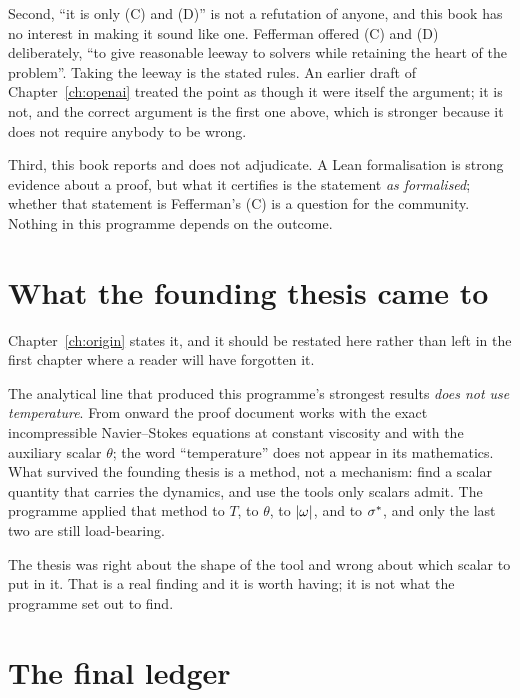 Second, ``it is only (C) and (D)'' is not a refutation of anyone, and this
book has no interest in making it sound like one. Fefferman offered (C) and
(D) deliberately, ``to give reasonable leeway to solvers while retaining the
heart of the problem''. Taking the leeway is the stated rules. An earlier
draft of Chapter~\ref{ch:openai} treated the point as though it were itself
the argument; it is not, and the correct argument is the first one above,
which is stronger because it does not require anybody to be wrong.

Third, this book reports and does not adjudicate. A Lean formalisation is
strong evidence about a proof, but what it certifies is the statement
\emph{as formalised}; whether that statement is Fefferman's (C) is a question
for the community. Nothing in this programme depends on the outcome.

\section{What the founding thesis came to}
\label{sec:thesis-verdict}

Chapter~\ref{ch:origin} states it, and it should be restated here rather than
left in the first chapter where a reader will have forgotten it.

The analytical line that produced this programme's strongest results
\emph{does not use temperature}. From  onward the proof document works
with the exact incompressible Navier--Stokes equations at constant viscosity
and with the auxiliary scalar \(\theta\); the word ``temperature'' does not
appear in its mathematics. What survived the founding thesis is a method, not
a mechanism: find a scalar quantity that carries the dynamics, and use the
tools only scalars admit. The programme applied that method to \(T\), to
\(\theta\), to \(\left|\omega\right|\), and to \(\sigma^{*}\), and only the last two are
still load-bearing.

The thesis was right about the shape of the tool and wrong about which scalar
to put in it. That is a real finding and it is worth having; it is not what
the programme set out to find.

\section{The final ledger}
\label{sec:final-ledger}

